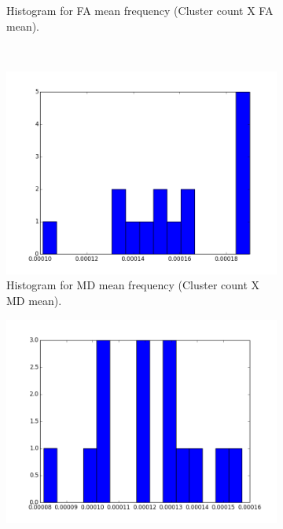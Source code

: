 \documentclass[a4paper,11pt]{report}
\begin{document}
\begin{figure}[!ht]
\begin{subfigure}[t]{.49\textwidth}
        \caption{Histogram for FA mean frequency (Cluster count X FA mean).}
        \label{subfig:fa_hist_fa}
      \end{subfigure}\hfill\\
      \begin{subfigure}[t]{.49\textwidth}
        \includegraphics[width=1\linewidth]{img/histograms/tv_clustered_fa_mask_md_means_hist.png}
        \caption{Histogram for MD mean frequency (Cluster count X MD mean).}
        \label{subfig:fa_hist_md}
      \end{subfigure}\hfill%
      \begin{subfigure}[t]{.49\textwidth}
        \includegraphics[width=1\linewidth]{img/histograms/tv_clustered_fa_mask_rd_means_hist.png}

\end{subfigure}
\end{figure}
\end{document}
